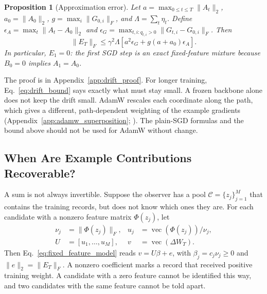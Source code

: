 \documentclass[11pt]{article}
\theoremstyle{plain}
\newtheorem{proposition}{Proposition}
\theoremstyle{definition}
\begin{document}
\begin{proposition}[Approximation error]
\label{prop:drift_bound}
Let $a=\max_{0\leq t\leq T}\|A_t\|_2$, $a_0=\|A_0\|_2$, $g=\max_i\|G_{0,i}\|_F$, and $\Lambda=\sum_t\eta_t$.
Define $\epsilon_A=\max_t\|A_t-A_0\|_2$ and $\epsilon_G=\max_{t,i:q_{t,i}>0}\|G_{t,i}-G_{0,i}\|_F$.
Then
\begin{equation}
\|E_T\|_F\leq\gamma^2\Lambda
\left[a^2\epsilon_G+g(a+a_0)\epsilon_A\right].
\label{eq:drift_bound}
\end{equation}
In particular, $E_1=0$: the first SGD step is an exact fixed-feature mixture because $B_0=0$ implies $A_1=A_0$.
\end{proposition}

The proof is in Appendix~\ref{app:drift_proof}.
For longer training, Eq.~\eqref{eq:drift_bound} says exactly what must stay small. A frozen backbone alone does not keep the drift small.
AdamW rescales each coordinate along the path, which gives a different, path-dependent weighting of the example gradients (Appendix~\ref{app:adamw_superposition}; \citealp{loshchilov2019decoupled}).
The plain-SGD formulas and the bound above should not be used for AdamW without change.

\subsection{When Are Example Contributions Recoverable?}
\label{sec:identifiability}

A sum is not always invertible.
Suppose the observer has a pool $\mathcal C=\{z_j\}_{j=1}^M$ that contains the training records, but does not know which ones they are.
For each candidate with a nonzero feature matrix $\Phi(z_j)$, let
\begin{equation}
\begin{aligned}
\nu_j&=\|\Phi(z_j)\|_F,&
 u_j&=\operatorname{vec}(\Phi(z_j))/\nu_j,\\
U&=[u_1,\ldots,u_M],&
 v&=\operatorname{vec}(\Delta W_T).
\end{aligned}
\label{eq:candidate_dictionary}
\end{equation}
Then Eq.~\eqref{eq:fixed_feature_model} reads $v=U\beta+e$, with $\beta_j=c_j\nu_j\geq0$ and $\|e\|_2=\|E_T\|_F$.
A nonzero coefficient marks a record that received positive training weight.
A candidate with a zero feature cannot be identified this way, and two candidates with the same feature cannot be told apart.
\end{document}

